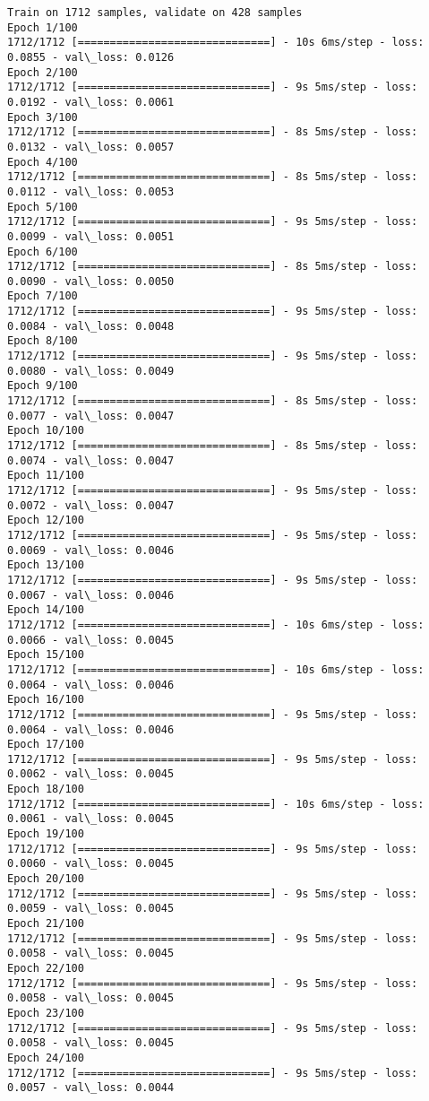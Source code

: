 \documentclass[11pt]{article}
\begin{document}
    \begin{Verbatim}[commandchars=\\\{\}]
Train on 1712 samples, validate on 428 samples
Epoch 1/100
1712/1712 [==============================] - 10s 6ms/step - loss: 0.0855 - val\_loss: 0.0126
Epoch 2/100
1712/1712 [==============================] - 9s 5ms/step - loss: 0.0192 - val\_loss: 0.0061
Epoch 3/100
1712/1712 [==============================] - 8s 5ms/step - loss: 0.0132 - val\_loss: 0.0057
Epoch 4/100
1712/1712 [==============================] - 8s 5ms/step - loss: 0.0112 - val\_loss: 0.0053
Epoch 5/100
1712/1712 [==============================] - 9s 5ms/step - loss: 0.0099 - val\_loss: 0.0051
Epoch 6/100
1712/1712 [==============================] - 8s 5ms/step - loss: 0.0090 - val\_loss: 0.0050
Epoch 7/100
1712/1712 [==============================] - 9s 5ms/step - loss: 0.0084 - val\_loss: 0.0048
Epoch 8/100
1712/1712 [==============================] - 9s 5ms/step - loss: 0.0080 - val\_loss: 0.0049
Epoch 9/100
1712/1712 [==============================] - 8s 5ms/step - loss: 0.0077 - val\_loss: 0.0047
Epoch 10/100
1712/1712 [==============================] - 8s 5ms/step - loss: 0.0074 - val\_loss: 0.0047
Epoch 11/100
1712/1712 [==============================] - 9s 5ms/step - loss: 0.0072 - val\_loss: 0.0047
Epoch 12/100
1712/1712 [==============================] - 9s 5ms/step - loss: 0.0069 - val\_loss: 0.0046
Epoch 13/100
1712/1712 [==============================] - 9s 5ms/step - loss: 0.0067 - val\_loss: 0.0046
Epoch 14/100
1712/1712 [==============================] - 10s 6ms/step - loss: 0.0066 - val\_loss: 0.0045
Epoch 15/100
1712/1712 [==============================] - 10s 6ms/step - loss: 0.0064 - val\_loss: 0.0046
Epoch 16/100
1712/1712 [==============================] - 9s 5ms/step - loss: 0.0064 - val\_loss: 0.0046
Epoch 17/100
1712/1712 [==============================] - 9s 5ms/step - loss: 0.0062 - val\_loss: 0.0045
Epoch 18/100
1712/1712 [==============================] - 10s 6ms/step - loss: 0.0061 - val\_loss: 0.0045
Epoch 19/100
1712/1712 [==============================] - 9s 5ms/step - loss: 0.0060 - val\_loss: 0.0045
Epoch 20/100
1712/1712 [==============================] - 9s 5ms/step - loss: 0.0059 - val\_loss: 0.0045
Epoch 21/100
1712/1712 [==============================] - 9s 5ms/step - loss: 0.0058 - val\_loss: 0.0045
Epoch 22/100
1712/1712 [==============================] - 9s 5ms/step - loss: 0.0058 - val\_loss: 0.0045
Epoch 23/100
1712/1712 [==============================] - 9s 5ms/step - loss: 0.0058 - val\_loss: 0.0045
Epoch 24/100
1712/1712 [==============================] - 9s 5ms/step - loss: 0.0057 - val\_loss: 0.0044

\end{Verbatim}
\end{document}
